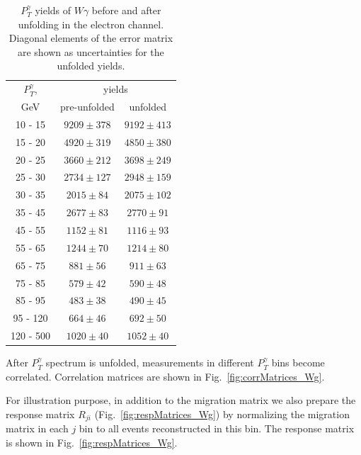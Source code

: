 \begin{table}[h]
  \scriptsize
  \begin{center}
  \caption{$P_T^{\gamma}$ yields of $W\gamma$ before and after unfolding in the electron channel. Diagonal elements of the error matrix are shown as uncertainties for the unfolded yields.}
  \begin{tabular}{|c|c|c|}
\hline
  $P_T^{\gamma}$, &    \multicolumn{2}{|c|}{yields}  \\ 
  GeV           &  pre-unfolded &  unfolded  \\ \hline

 10 -  15 &     $9209\pm 378$ &     $9192\pm 413$  \\ \hline
 15 -  20 &     $4920\pm 319$ &     $4850\pm 380$  \\ \hline
 20 -  25 &     $3660\pm 212$ &     $3698\pm 249$  \\ \hline
 25 -  30 &     $2734\pm 127$ &     $2948\pm 159$  \\ \hline
 30 -  35 &     $2015\pm  84$ &     $2075\pm 102$  \\ \hline
 35 -  45 &     $2677\pm  83$ &     $2770\pm  91$  \\ \hline
 45 -  55 &     $1152\pm  81$ &     $1116\pm  93$  \\ \hline
 55 -  65 &     $1244\pm  70$ &     $1214\pm  80$  \\ \hline
 65 -  75 &     $881\pm  56$ &     $911\pm  63$  \\ \hline
 75 -  85 &     $579\pm  42$ &     $590\pm  48$  \\ \hline
 85 -  95 &     $483\pm  38$ &     $490\pm  45$  \\ \hline
 95 - 120 &     $664\pm  46$ &     $692\pm  50$  \\ \hline
120 - 500 &     $1020\pm  40$ &     $1052\pm  40$  \\ \hline
  \end{tabular}
  \label{tab:unf_results_ELECTRON_WGamma}
  \end{center}
\end{table}

After $P_T^{\gamma}$ spectrum is unfolded, measurements in different $P_T^{\gamma}$ bins become correlated. Correlation matrices are shown in Fig.~\ref{fig:corrMatrices_Wg}. 

For illustration purpose, in addition to the migration matrix we also prepare the response matrix $R_{ji}$ (Fig.~\ref{fig:respMatrices_Wg}) by normalizing the migration matrix in each $j$ bin to all events reconstructed in this bin. The response matrix is shown in Fig.~\ref{fig:respMatrices_Wg}.

